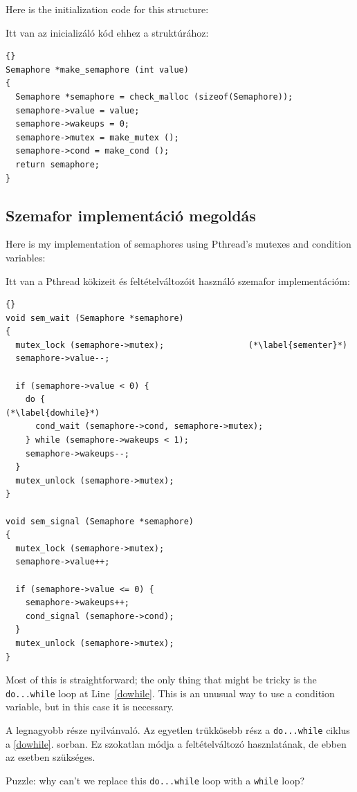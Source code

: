 \documentclass{book}
\newcommand{\clearemptydoublepage}{\newpage\cleardoublepage}
\begin{document}
Here is the initialization code for this structure:

Itt van az inicializáló kód ehhez a struktúrához:

\begin{lstlisting}[title={}]{}
Semaphore *make_semaphore (int value)
{
  Semaphore *semaphore = check_malloc (sizeof(Semaphore));
  semaphore->value = value;
  semaphore->wakeups = 0;
  semaphore->mutex = make_mutex ();
  semaphore->cond = make_cond ();
  return semaphore;
}
\end{lstlisting}


\clearemptydoublepage
\subsection{Szemafor implementáció megoldás}

Here is my implementation of semaphores using Pthread's mutexes
and condition variables:

Itt van a Pthread kökizeit és feltételváltozóit használó
szemafor implementációm:

\begin{lstlisting}[title={}]{}
void sem_wait (Semaphore *semaphore)
{
  mutex_lock (semaphore->mutex);                 (*\label{sementer}*)
  semaphore->value--;

  if (semaphore->value < 0) {
    do {                                                (*\label{dowhile}*)
      cond_wait (semaphore->cond, semaphore->mutex);
    } while (semaphore->wakeups < 1);
    semaphore->wakeups--;
  }
  mutex_unlock (semaphore->mutex);
}

void sem_signal (Semaphore *semaphore)
{
  mutex_lock (semaphore->mutex);
  semaphore->value++;

  if (semaphore->value <= 0) {
    semaphore->wakeups++;
    cond_signal (semaphore->cond);
  }
  mutex_unlock (semaphore->mutex);
}
\end{lstlisting}

Most of this is straightforward; the only thing that might be 
tricky is the {\tt do...while} loop at Line~\ref{dowhile}.
This is an unusual way to use a condition variable, but in
this case it is necessary.

A legnagyobb része nyilvánvaló. Az egyetlen trükkösebb
rész a {\tt do...while} ciklus a \ref{dowhile}. sorban.
Ez szokatlan módja a feltételváltozó hasznlatának, de
ebben az esetben szükséges.

Puzzle: why can't we replace this {\tt do...while} loop
with a {\tt while} loop?
\end{document}
